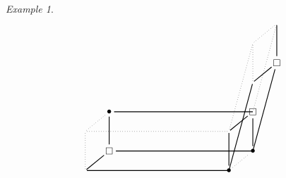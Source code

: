 \documentclass[12pt]{amsart}
\theoremstyle{definition}
\theoremstyle{remark}
\newtheorem{example}[thm]{Example}
\numberwithin{equation}{section}
\begin{document}
\begin{example}
\begin{equation}
\begin{array}{l}
\begin{tikzpicture}[yscale=0.7,xscale=0.85]
\begin{scope}[xshift=10cm]
\begin{scope}[xshift=6cm]

\node[inner sep=1pt,circle] (00) at (0,0) {\tiny $ $};
\node[inner sep=1pt,circle] (11) at (1,1) {\large $\square$};
\node[inner sep=1pt,circle] (02) at (0,2) {\tiny $ $};
\node[inner sep=1pt,circle] (13) at (1,3) {\tiny $ $};

\draw[-,dotted] (00) -- (02); 
\draw[-,thick] (11) -- (13); 
\draw[-,thick] (00) -- (11);
\draw[-,dotted] (02) -- (13);

\draw[-,thick] (00) -- (-1,-4.5);
\draw[-,thick] (11) -- (0,-3.5);
\draw[-,dotted] (02) -- (-1,-2.5);
\draw[-,dotted] (13) -- (0,-1.5);

\end{scope}

\begin{scope}[yshift=-4.5cm,xshift=-1cm]

\node[inner sep=1pt,circle] (00) at (0,0) {\tiny $ $};
\node[inner sep=1pt,circle] (11) at (1,1) {\large $\square$};
\node[inner sep=1pt,circle] (02) at (0,2) {\tiny $ $};
\node[inner sep=1pt,circle] (13) at (1,3) {\Large $\bullet$};

\draw[-,dotted] (00) -- (02); 
\draw[-,thick] (11) -- (13); 
\draw[-,thick] (00) -- (11);
\draw[-,dotted] (02) -- (13);
    

\draw[-,thick] (00) -- (6,0);
\draw[-,thick] (13) -- (7,3);
\draw[-,thick] (11) -- (7,1);
\draw[-,dotted] (02) -- (6,2);

\end{scope}

\begin{scope}[yshift=-4.5cm,xshift=5cm]

\node[inner sep=1pt,circle] (00) at (0,0) {\Large$\bullet$};
\node[inner sep=1pt,circle] (11) at (1,1) {\Large$\bullet$};
\node[inner sep=1pt,circle] (02) at (0,2) {\tiny $ $};
\node[inner sep=1pt,circle] (13) at (1,3) {\large $\square$};

\draw[-,thick] (00) -- (02); 
\draw[-,thick] (11) -- (13); 
\draw[-,dotted] (00) -- (11);
\draw[-,thick] (02) -- (13);

\end{scope}

\end{scope}

\end{tikzpicture}
\end{array}
\end{equation}
\end{example}
\end{document}
